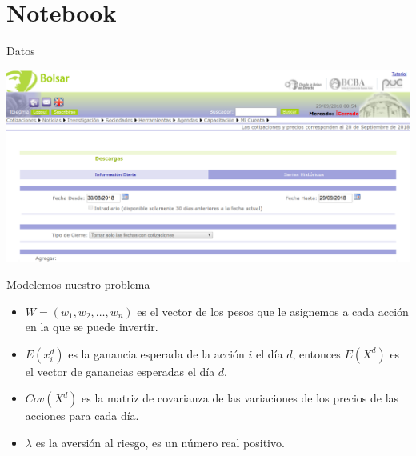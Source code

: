 \documentclass[12pt,aspectratio=169]{beamer}
\begin{document}
\section{Notebook}

\begin{frame}{Datos}
\begin{center}
\includegraphics[width = .7\paperwidth]{bolsar.png}
\end{center}
\end{frame}

\begin{frame}{Modelemos nuestro problema}
\begin{itemize}
\item $W = (w_1, w_2, \dots, w_n)$ es el vector de los pesos que le asignemos a cada acción en la que se puede invertir.
\item $E(x_i^d)$ es la ganancia esperada de la acción $i$ el día $d$, entonces $E(X^d)$ es el vector de ganancias esperadas el día $d$.
\item $Cov(X^d)$ es la matriz de covarianza de las variaciones de los precios de las acciones para cada día.
\item $\lambda$ es la aversión al riesgo, es un número real positivo.
\end{itemize}



\end{frame}
\end{document}
